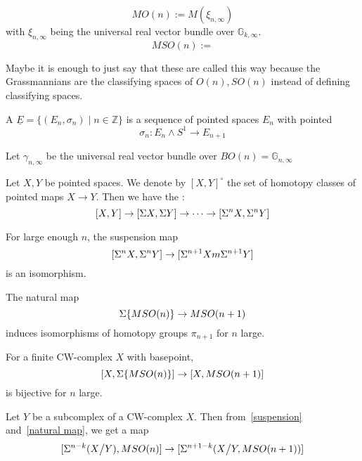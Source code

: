 \documentclass[a4paper,11pt]{article}
\begin{document}
\begin{definition}
    \[MO(n):=M(\xi_{n,\infty})\] with \(\xi_{n,\infty}\) being the universal real vector bundle over \(\mathbb{G}_{k,\infty}\).
    \[MSO(n):=  \]
\end{definition}
Maybe it is enough to just say that these are called this way because the Grassmannians are the classifying spaces of \(O(n), SO(n)\) instead of defining classifying spaces.

\begin{definition}
    A  \(\underline E = \{(E_n,\sigma_n)\mid n\in\mathbb{Z}\}\) is a sequence of pointed spaces \(E_n\) with pointed \[\sigma_n:E_n\wedge{S^1}\to E_{n+1}\]
\end{definition}

\begin{definition}
    Let \(\gamma_{n,\infty}\) be the universal real vector bundle over \(BO(n)=\mathbb{G}_{n,\infty}\)
\end{definition}

\begin{theorem}\label{suspension}
    Let \(X, Y\) be pointed spaces. We denote by \({[X,Y]}^\circ\) the set of homotopy classes of pointed maps \(X\to Y\). Then we have the :
    \[[X,Y]\to[\Sigma{X},\Sigma{Y}]\to\dots\to[\Sigma^n{X},\Sigma^n{Y}]\] 
\end{theorem}


\begin{theorem}\label{freudenthal}
    For large enough \(n\), the suspension map
    \[[\Sigma^nX,\Sigma^nY]\to[\Sigma^{n+1}Xm\Sigma^{n+1}Y]\]
    is an isomorphism.
\end{theorem}


\begin{lemma}\label{natural map}\cite{thom}
    The natural map
    \[\Sigma\{MSO(n)\}\to MSO(n+1)\]
    induces isomorphisms of homotopy groups \(\pi_{n+1}\) for \(n\) large.
\end{lemma}

\begin{corollary}
    For a finite CW-complex \(X\) with basepoint, \[[X,\Sigma\{MSO(n)\}]\to[X,MSO(n+1)]\] is bijective for \(n\) large.
\end{corollary}

\begin{lemma}
    Let \(Y\) be a subcomplex of a CW-complex \(X\). Then from\ \ref{suspension} and\ \ref{natural map}, we get a map
    \[[\Sigma^{n-k}(X\big/ Y),MSO(n)]\to[\Sigma^{n+1-k}(X\big/Y, MSO(n+1))]\]
\end{lemma}
\end{document}
